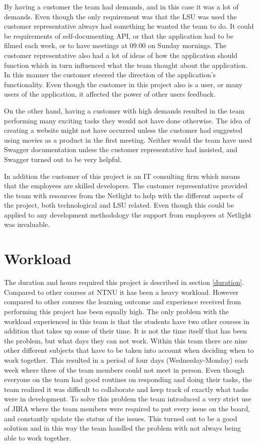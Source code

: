 By having a customer the team had demands, and in this case it was a lot of demands. Even though the only requirement was that the \gls{LSU} was used the customer representative always had something he wanted the team to do. It could be requirements of self-documenting API, or that the application had to be filmed each week, or to have meetings at 09.00 on Sunday mornings. The customer representative also had a lot of ideas of how the application should function which in turn influenced what the team thought about the application. In this manner the customer steered the direction of the application’s functionality. Even though the customer in this project also is a user, or many users of the application, it affected the power of other users feedback. 

On the other hand, having a customer with high demands resulted in the team performing many exciting tasks they would not have done otherwise. The idea of creating a website might not have occurred unless the customer had suggested using movies as a product in the first meeting. Neither would the team have used Swagger documentation unless the customer representative had insisted, and Swagger turned out to be very helpful. 

In addition the customer of this project is an IT consulting firm which means that the employees are skilled developers. The customer representative provided the team with resources from the Netlight to help with the different aspects of the project, both technological and \gls{LSU} related. Even though this could be applied to any development methodology the support from employees at Netlight was invaluable.

\section{Workload}
\label{workload}
The duration and hours required this project is described in section \ref{duration}. Compared to other courses at \gls{NTNU} it has been a heavy workload. However compared to other courses the learning outcome and experience received from performing this project has been equally high. The only problem with the workload experienced in this team is that the students have two other courses in addition that takes up some of their time. It is not the time itself that has been the problem, but what days they can not work. 
Within this team there are nine other different subjects that have to be taken into account when deciding when to work together. This resulted in a period of four days (Wednesday-Monday) each week where three of the team members could not meet in person. Even though everyone on the team had good routines on responding and doing their tasks, the team realized it was difficult to collaborate and keep track of exactly what tasks were in development. To solve this problem the team introduced a very strict use of JIRA where the team members were required to put every issue on the board, and constantly update the status of the issues. This turned out to be a good solution and in this way the team handled the problem with not always being able to work together.

